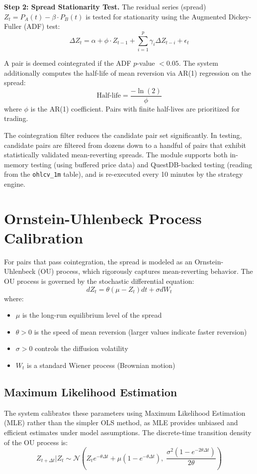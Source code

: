 \documentclass[letterpaper,11pt]{report}
\begin{document}
\textbf{Step 2: Spread Stationarity Test.} The residual series (spread) $Z_t = P_A(t) - \beta \cdot P_B(t)$ is tested for stationarity using the Augmented Dickey-Fuller (ADF) test:
$$\Delta Z_t = \alpha + \phi \cdot Z_{t-1} + \sum_{i=1}^{p} \gamma_i \Delta Z_{t-i} + \epsilon_t$$

A pair is deemed cointegrated if the ADF $p$-value $< 0.05$. The system additionally computes the half-life of mean reversion via AR(1) regression on the spread:
$$\text{Half-life} = \frac{-\ln(2)}{\phi}$$
where $\phi$ is the AR(1) coefficient. Pairs with finite half-lives are prioritized for trading.

The cointegration filter reduces the candidate pair set significantly. In testing, candidate pairs are filtered from dozens down to a handful of pairs that exhibit statistically validated mean-reverting spreads. The module supports both in-memory testing (using buffered price data) and QuestDB-backed testing (reading from the \texttt{ohlcv\_1m} table), and is re-executed every 10 minutes by the strategy engine.

\section{Ornstein-Uhlenbeck Process Calibration}

For pairs that pass cointegration, the spread is modeled as an Ornstein-Uhlenbeck (OU) process, which rigorously captures mean-reverting behavior. The OU process is governed by the stochastic differential equation:
$$dZ_t = \theta(\mu - Z_t)dt + \sigma dW_t$$
where:
\begin{itemize}
    \item $\mu$ is the long-run equilibrium level of the spread
    \item $\theta > 0$ is the speed of mean reversion (larger values indicate faster reversion)
    \item $\sigma > 0$ controls the diffusion volatility
    \item $W_t$ is a standard Wiener process (Brownian motion)
\end{itemize}

\subsection{Maximum Likelihood Estimation}

The system calibrates these parameters using Maximum Likelihood Estimation (MLE) rather than the simpler OLS method, as MLE provides unbiased and efficient estimates under model assumptions. The discrete-time transition density of the OU process is:
$$Z_{t+\Delta t} | Z_t \sim \mathcal{N}\left(Z_t e^{-\theta\Delta t} + \mu(1 - e^{-\theta\Delta t}),\; \frac{\sigma^2(1 - e^{-2\theta\Delta t})}{2\theta}\right)$$
\end{document}
